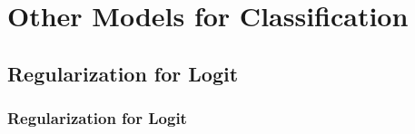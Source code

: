 \documentclass[
  shownotes,
  xcolor={svgnames},
  hyperref={colorlinks,citecolor=DarkBlue,linkcolor=andesred,urlcolor=DarkBlue}
  , aspectratio=169]{beamer}
\begin{document}
\section{Other Models for Classification}
\subsection{Regularization for Logit}
\begin{frame}[fragile]
\frametitle{Regularization for Logit}

\end{frame}
\end{document}
